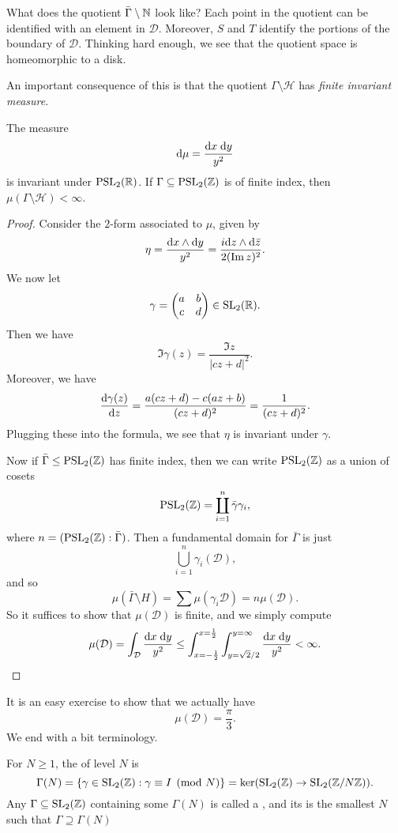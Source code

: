 \documentclass[a4paper]{article}
\renewcommand{\H}{\mathcal{H}}
\begin{document}
What does the quotient $\bar{\Gamma}\setminus \mathbb{N}$ look like? Each point in the quotient can be identified with an element in $\mathcal{D}$. Moreover, $S$ and $T$ identify the portions of the boundary of $\mathcal{D}$. Thinking hard enough, we see that the quotient space is homeomorphic to a disk.

An important consequence of this is that the quotient $\Gamma \setminus \H$ has \emph{finite invariant measure}.
\begin{prop}
  The measure
  \[
    \mathrm{d} \mu = \frac{\mathrm{d} x\;\mathrm{d} y}{y^2}
  \]
  is invariant under $\mathrm{PSL}_2(\mathbb{R})$. If $\Gamma \subseteq \mathrm{PSL}_2(\mathbb{Z})$ is of finite index, then $\mu(\Gamma\setminus \H) < \infty$.
\end{prop}

\begin{proof}
  Consider the $2$-form associated to $\mu$, given by
  \[
    \eta = \frac{\mathrm{d} x \wedge \mathrm{d} y}{y^2} = \frac{i \mathrm{d} z \wedge \mathrm{d} \bar{z}}{2 (\operatorname{Im} z)^2}.
  \]
  We now let
  \[
    \gamma =
    \begin{pmatrix}
      a & b\\
      c & d
    \end{pmatrix} \in \mathrm{SL}_2(\mathbb{R}).
  \]
  Then we have
  \[
    \Im \gamma(z) = \frac{\Im z}{|cz + d|^2}.
  \]
  Moreover, we have
  \[
    \frac{\mathrm{d} \gamma(z)}{\mathrm{d} z} = \frac{a(cz + d) - c(az + b)}{(cz + d)^2} = \frac{1}{(cz + d)^2}.
  \]
  Plugging these into the formula, we see that $\eta$ is invariant under $\gamma$.

  Now if $\bar\Gamma \leq \mathrm{PSL}_2(\mathbb{Z})$ has finite index, then we can write $\mathrm{PSL}_2(\mathbb{Z})$ as a union of cosets
  \[
    \mathrm{PSL}_2(\mathbb{Z}) = \coprod_{i = 1}^n \bar\gamma \gamma_i,
  \]
  where $n = (\mathrm{PSL}_2(\mathbb{Z}): \bar\Gamma)$. Then a fundamental domain for $\bar\Gamma$ is just
  \[
    \bigcup_{i = 1}^n \gamma_i(\mathcal{D}),
  \]
  and so
  \[
    \mu(\bar\Gamma \setminus H) = \sum \mu(\gamma_i \mathcal{D}) = n \mu(\mathcal{D}).
  \]
  So it suffices to show that $\mu(\mathcal{D})$ is finite, and we simply compute
  \[
    \mu(\mathcal{D}) = \int_\mathcal{D} \frac{\mathrm{d} x\; \mathrm{d} y}{y^2} \leq \int_{x = -\frac{1}{2}}^{x = \frac{1}{2}}\int_{y = \sqrt{2}/2}^{y = \infty} \frac{\mathrm{d} x\;\mathrm{d} y}{y^2} < \infty.\qedhere
  \]
\end{proof}
It is an easy exercise to show that we actually have
\[
  \mu(\mathcal{D}) = \frac{\pi}{3}.
\]
We end with a bit terminology.
\begin{defi}
  For $N \geq 1$, the  of level $N$ is
  \[
    \Gamma(N) = \{\gamma \in \mathrm{SL}_2(\mathbb{Z}) : \gamma \equiv I \pmod N\} = \ker (\mathrm{SL}_2(\mathbb{Z}) \to \mathrm{SL}_2(\mathbb{Z}/N\mathbb{Z})).
  \]
  Any $\Gamma \subseteq \mathrm{SL}_2(\mathbb{Z})$ containing some $\Gamma(N)$ is called a , and its  is the smallest $N$ such that $\Gamma \supseteq \Gamma(N)$
\end{defi}
\end{document}
